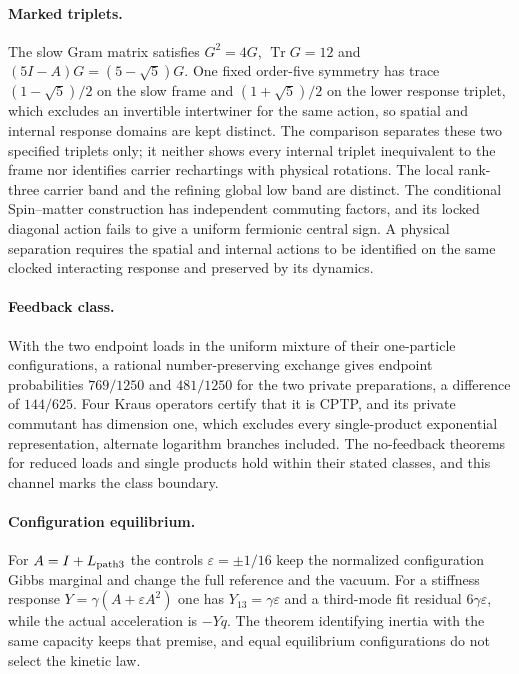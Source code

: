 \documentclass[11pt]{article}
\theoremstyle{definition}
\theoremstyle{remark}
\theoremstyle{plain}
\newcommand{\Tr}{\operatorname{Tr}}
\begin{document}
\paragraph{Marked triplets.} The slow Gram matrix satisfies $G^2=4G$,
$\Tr G=12$ and $(5I-A)G=(5-\sqrt5)G$. One fixed order-five symmetry has trace
$(1-\sqrt5)/2$ on the slow frame and $(1+\sqrt5)/2$ on the lower response
triplet, which excludes an invertible intertwiner for the same action, so
spatial and internal response domains are kept distinct. The comparison
separates these two specified triplets only; it neither shows every internal
triplet inequivalent to the frame nor identifies carrier rechartings with
physical rotations. The local rank-three carrier band and the refining global
low band are distinct. The conditional Spin--matter construction has
independent commuting factors, and its locked diagonal action fails to give a
uniform fermionic central sign. A physical separation requires the spatial
and internal actions to be identified on the same clocked interacting
response and preserved by its dynamics.

\paragraph{Feedback class.} With the two endpoint loads in the uniform
mixture of their one-particle configurations, a rational number-preserving
exchange gives endpoint probabilities $769/1250$ and $481/1250$ for the two
private preparations, a difference of $144/625$. Four Kraus operators certify
that it is CPTP, and its private commutant has dimension one, which excludes
every single-product exponential representation, alternate logarithm
branches included. The no-feedback theorems for reduced loads and single
products hold within their stated classes, and this channel marks the class
boundary.

\paragraph{Configuration equilibrium.} For $A=I+L_{\rm path3}$ the controls
$\varepsilon=\pm1/16$ keep the normalized configuration Gibbs marginal and
change the full reference and the vacuum. For a stiffness response
$Y=\gamma(A+\varepsilon A^2)$ one has $Y_{13}=\gamma\varepsilon$ and a
third-mode fit residual $6\gamma\varepsilon$, while the actual acceleration is
$-Yq$. The theorem identifying inertia with the same capacity keeps that
premise, and equal equilibrium configurations do not select the kinetic law.
\end{document}
